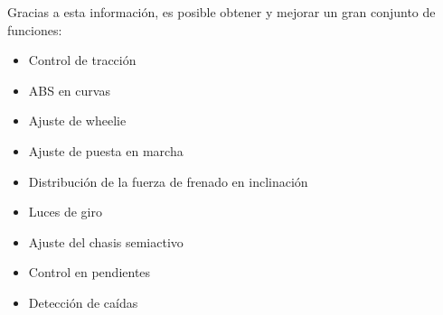 			Gracias a esta información, es posible obtener y mejorar un gran conjunto de funciones:
				
				\begin{itemize}
					\item Control de tracción
					\item ABS en curvas
					\item Ajuste de wheelie
					\item Ajuste de puesta en marcha
					\item Distribución de la fuerza de frenado en inclinación
					\item Luces de giro
					\item Ajuste del chasis semiactivo
					\item Control en pendientes
					\item Detección de caídas
			    \end{itemize}

	\newpage
	$\ $